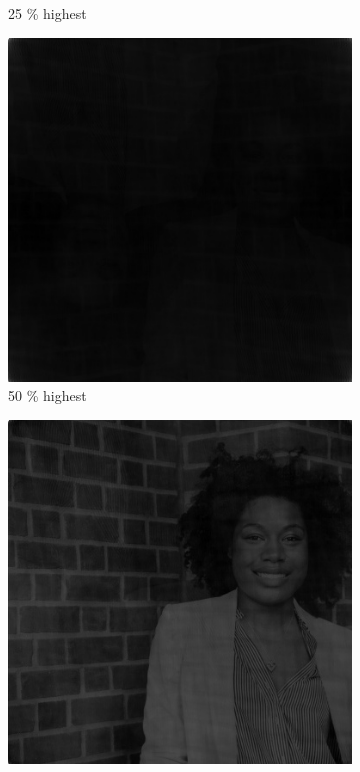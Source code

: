 \begin{figure}[h!]
\begin{subfigure}{0.2\textwidth}
  \caption{25 \% highest}
\end{subfigure}%
\begin{subfigure}{0.2\textwidth}
  \centering
  \includegraphics[width=0.95\linewidth]{output/phase_high_50.jpg}
  \caption{50 \% highest}
  \label{fig:high-phase-c}
\end{subfigure}%
\begin{subfigure}{0.2\textwidth}
  \centering
  \includegraphics[width=0.95\linewidth]{output/phase_high_75.jpg}

\end{subfigure}
\end{figure}
